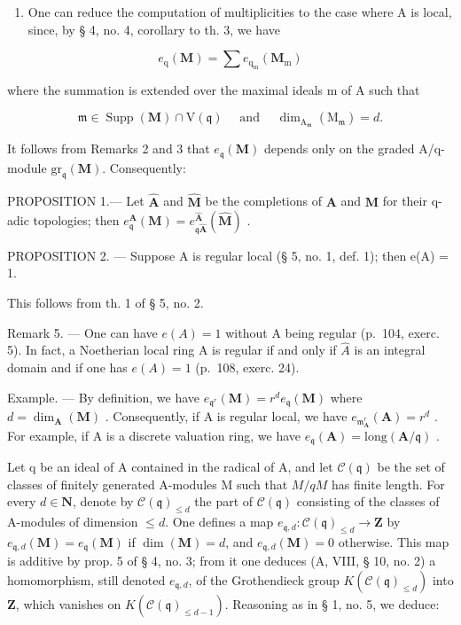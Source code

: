 \begin{enumerate}
\def\labelenumi{\arabic{enumi})}
\setcounter{enumi}{3}
\tightlist
\item
  One can reduce the computation of multiplicities to the case where A is local, since, by § 4, no. 4, corollary to th. 3, we have
\end{enumerate}

\[
e _ {\mathrm{q}} (\mathbf {M}) = \sum e _ {\mathrm{q} _ {\mathrm{m}}} (\mathbf {M} _ {\mathrm{m}})
\]

where the summation is extended over the maximal ideals m of A such that

\[
\mathfrak {m} \in \operatorname{Supp} (\mathbf {M}) \cap \mathrm{V} (\mathfrak {q}) \quad \text { and } \quad \dim_ {\mathrm{A} _ {\mathfrak {m}}} (\mathrm{M} _ {\mathfrak {m}}) = d  .
\]

It follows from Remarks 2 and 3 that \(e_{\mathfrak{q}}(\mathbf{M})\) depends only on the graded A/q-module \(\mathrm{gr}_{\mathfrak{q}}(\mathbf{M})\). Consequently:

PROPOSITION 1.--- Let \(\hat{\mathbf{A}}\) and \(\hat{\mathbf{M}}\) be the completions of \(\mathbf{A}\) and \(\mathbf{M}\) for their q-adic topologies; then \(e_{\mathfrak{q}}^{\mathbf{A}}(\mathbf{M}) = e_{\mathfrak{q}\hat{\mathbf{A}}}^{\hat{\mathbf{A}}}(\hat{\mathbf{M}})\) .

PROPOSITION 2. --- Suppose A is regular local (§ 5, no. 1, def. 1); then e(A) = 1.

This follows from th. 1 of § 5, no. 2.

Remark 5. --- One can have \(e(A) = 1\) without A being regular (p.~104, exerc. 5). In fact, a Noetherian local ring A is regular if and only if \(\hat{A}\) is an integral domain and if one has \(e(A) = 1\) (p.~108, exerc. 24).

Example. --- By definition, we have \(e_{\mathfrak{q}^{r}}(\mathbf{M}) = r^{d}e_{\mathfrak{q}}(\mathbf{M})\) where \(d = \dim_{\mathbf{A}}(\mathbf{M})\) . Consequently, if A is regular local, we have \(e_{\mathfrak{m}_{\mathbf{A}}^{r}}(\mathbf{A}) = r^{d}\) . For example, if A is a discrete valuation ring, we have \(e_{\mathfrak{q}}(\mathbf{A}) = \text{long}(\mathbf{A}/\mathfrak{q})\) .

Let q be an ideal of A contained in the radical of A, and let \(\mathcal{C}(\mathfrak{q})\) be the set of classes of finitely generated A-modules M such that \(M/qM\) has finite length. For every \(d \in \mathbf{N}\), denote by \(\mathcal{C}(\mathfrak{q})_{\leq d}\) the part of \(\mathcal{C}(\mathfrak{q})\) consisting of the classes of A-modules of dimension \(\leqslant d\). One defines a map \(e_{\mathfrak{q},d}: \mathcal{C}(\mathfrak{q})_{\leq d} \to \mathbf{Z}\) by \(e_{\mathfrak{q},d}(\mathbf{M}) = e_{\mathfrak{q}}(\mathbf{M})\) if \(\dim(\mathbf{M}) = d\), and \(e_{\mathfrak{q},d}(\mathbf{M}) = 0\) otherwise. This map is additive by prop. 5 of § 4, no. 3; from it one deduces (A, VIII, § 10, no. 2) a homomorphism, still denoted \(e_{\mathfrak{q},d}\), of the Grothendieck group \(K(\mathcal{C}(\mathfrak{q})_{\leq d})\) into \(\mathbf{Z}\), which vanishes on \(K(\mathcal{C}(\mathfrak{q})_{\leq d-1})\). Reasoning as in § 1, no. 5, we deduce:

